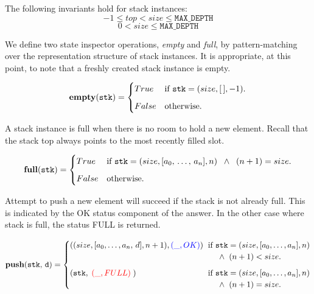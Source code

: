 \documentclass[10pt]{article}
\begin{document}
    The following invariants hold for stack instances:
    \[
        -1 \leq top < size \leq \mathtt{MAX\_DEPTH}
    \]
    \[
        0 < size \leq \mathtt{MAX\_DEPTH}
    \]
    
    We define two state inspector operations, \emph{empty} and \emph{full}, by pattern-matching over the representation structure of stack instances. It is appropriate, at this point, to note that a freshly created stack instance is empty.

    \[
        \mathtt{\mathbf{empty}(stk)} = \begin{cases} True & \mbox{if  } \mathtt{stk} = (size, [\,], -1). \vspace*{6pt}\\ 
        False & \mbox{otherwise}. \end{cases} 
    \]

    A stack instance is full when there is no room to hold a new element. Recall that the stack top always points to the most recently filled slot.

    \[
        \mathtt{\mathbf{full}(stk)} = \begin{cases} True & \mbox{if  } \mathtt{stk} = (size, [a_0, \, \ldots, \, a_n], n)  \;\; \wedge \;\; (n+1) = size. \vspace*{6pt}\\ 
        False & \mbox{otherwise}. \end{cases} 
    \]
    
    Attempt to push a new element will succeed if the stack is not already full. This is indicated by the OK status component of the answer. In the other case where stack is full, the status FULL is returned.

    \[
        \mathtt{\mathbf{push}(stk,\, d)} = \begin{cases} ((size, [a_0, \dots, a_n, \, d], n+1),  {\textcolor{blue}{(\_, OK)}}) & \hspace*{-4pt}\mbox{if } \mathtt{stk} = (size, [a_0,\dots,a_n], n)\\ & \hspace*{10pt}\wedge\; \; (n+1) < size. \vspace*{6pt}\\ 
        (\mathtt{stk},\;{\textcolor{red}{(\_, FULL)}} \; ) & \hspace*{-4pt}\mbox{if } \mathtt{stk} = (size, [a_0,\dots,a_n], n)\\ %
        & \hspace*{10pt}\wedge\; \; (n+1) = size. \end{cases} 
    \]
\end{document}
